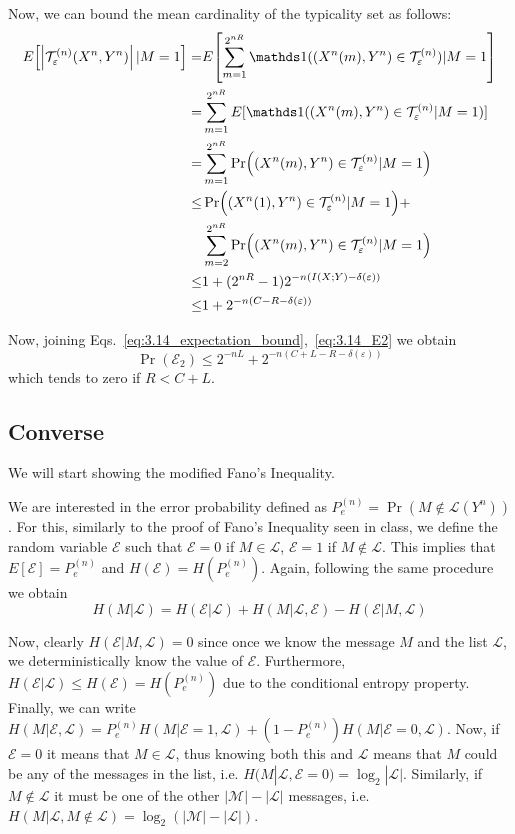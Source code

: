 Now, we can bound the mean cardinality of the typicality set as follows:
%
\begin{align} \label{eq:3.14_expectation_bound}
\begin{split}
E \qty[\qty|\typicalLong| \,|M=1] =& E\qty[ \sum_{m=1}^{2^{nR}} \indicator((X^n(m),Y^n) \in \typical) |M=1 ]\\
=& \sum_{m=1}^{2^{nR}} E[\indicator((X^n(m),Y^n)\in \typical |M=1)]\\
=& \sum_{m=1}^{2^{nR}} \Pr((X^n(m),Y^n)\in \typical |M=1)\\
\leq& \Pr((X^n(1),Y^n)\in \typical |M=1) +\\
&\sum_{m=2}^{2^{nR}} \Pr((X^n(m),Y^n)\in \typical |M=1)\\
\leq& 1 + (2^{nR}-1)2^{-n(I(X;Y)-\delta(\varepsilon))}\\
\leq& 1 + 2^{-n(C-R - \delta(\varepsilon))}
\end{split}
\end{align}

Now, joining Eqs.~\eqref{eq:3.14_expectation_bound},~\eqref{eq:3.14_E2} we obtain
%
\begin{equation}
\Pr(\mathcal{E}_2) \leq 2^{-nL} + 2^{-n(C+L-R - \delta(\varepsilon))}
\end{equation}
%
which tends to zero if $R<C+L$.

\subsection{Converse}
We will start showing the modified Fano's Inequality.

We are interested in the error probability defined as $P_e^{(n)} = \Pr(M \notin \mathcal{L}(Y^n))$. For this, similarly to the proof of Fano's Inequality seen in class, we define the random variable $\mathcal{E}$ such that $\mathcal{E}=0$ if $M \in \mathcal{L}$, $\mathcal{E}=1$ if $M \notin \mathcal{L}$. This implies that $E[\mathcal{E}] = P_e^{(n)}$ and $H(\mathcal{E}) = H(P_e^{(n)})$. Again, following the same procedure we obtain
%
\begin{equation}
H(M|\mathcal{L}) = H(\mathcal{E}|\mathcal{L})
+H(M|\mathcal{L},\mathcal{E})
-H(\mathcal{E}|M,\mathcal{L})
\end{equation}

Now, clearly $H(\mathcal{E}|M,\mathcal{L})=0$ since once we know the message $M$ and the list $\mathcal{L}$, we deterministically know the value of $\mathcal{E}$. Furthermore, $H(\mathcal{E}|\mathcal{L}) \leq H(\mathcal{E}) = H(P_e^{(n)})$ due to the conditional entropy property. Finally, we can write $H(M|\mathcal{E},\mathcal{L}) = P_e^{(n)} H(M|\mathcal{E}=1,\mathcal{L}) + (1-P_e^{(n)})H(M|\mathcal{E}=0,\mathcal{L})$. Now, if $\mathcal{E}=0$ it means that $M \in \mathcal{L}$, thus knowing both this and $\mathcal{L}$ means that $M$ could be any of the messages in the list, i.e. $H(M|\mathcal{L},\mathcal{E}=0) = \log_2|\mathcal{L}|$. Similarly, if $M \notin \mathcal{L}$ it must be one of the other $|\mathcal{M}|-|\mathcal{L}|$ messages, i.e. $H(M|\mathcal{L},M\notin \mathcal{L})=\log_2(|\mathcal{M}|-|\mathcal{L}|)$.

